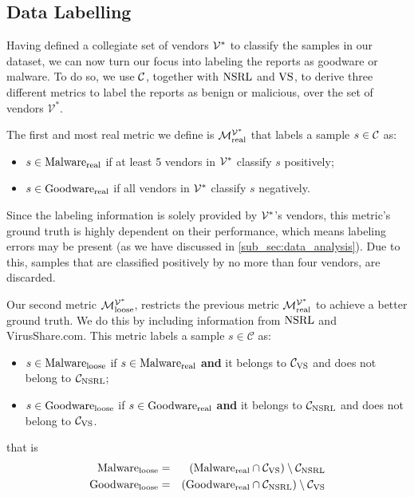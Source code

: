 \subsection{Data Labelling}\label{sub_sec:data_labeling}
Having defined a collegiate set of vendors $\mathcal{V}^*$ to classify the samples in our dataset, we can now turn our focus into labeling the reports as goodware or malware. 
To do so, we use $\mathcal{C}$, together with $\mathrm{NSRL}$ and $\mathrm{VS}$, to derive three different metrics to label the reports as benign or malicious, over the set of vendors $\mathcal{V}^*$.

The first and most real metric we define is $\mathcal{M}_{\mathrm{real}}^{\mathcal{V}^*}$ that labels a sample $s\in\mathcal{C}$ as:

\begin{itemize}
	\item $s\in\mathrm{Malware}_{\mathrm{real}}$ if at least 5 vendors in $\mathcal{V}^*$ classify $s$ positively;
	\item $s\in\mathrm{Goodware}_{\mathrm{real}}$ if all vendors in $\mathcal{V}^*$ classify $s$ negatively.
\end{itemize}

Since the labeling information is solely provided by $\mathcal{V}^*$'s vendors, this metric's ground truth is highly dependent on their performance, which means labeling errors may be present (as we have discussed in \ref{sub_sec:data_analysis}). 
Due to this, samples that are classified positively by no more than four vendors, are discarded.

\medskip

Our second metric $\mathcal{M}_{\mathrm{loose}}^{\mathcal{V}^*}$, restricts the previous metric $\mathcal{M}_{\mathrm{real}}^{\mathcal{V}^*}$ to achieve a better ground truth. We do this by including information from $\mathrm{NSRL}$ and VirusShare.com. 
This metric labels a sample $s\in\mathcal{C}$ as:

\begin{itemize}
	\item $s\in\mathrm{Malware}_{\mathrm{loose}}$ if $s\in\mathrm{Malware}_{\mathrm{real}}$ \textbf{and} it belongs to $\mathcal{C}_{\mathrm{VS}}$ and does not belong to $\mathcal{C}_{\mathrm{NSRL}}$;
	\item $s\in\mathrm{Goodware}_{\mathrm{loose}}$ if $s\in\mathrm{Goodware}_{\mathrm{real}}$ \textbf{and} it belongs to $\mathcal{C}_{\mathrm{NSRL}}$ and does not belong to $\mathcal{C}_{\mathrm{VS}}$.
\end{itemize}
that is
\begin{eqnarray*}
\mathrm{Malware}_{\mathrm{loose}}&=&\left(\mathrm{Malware}_{\mathrm{real}}\cap\mathcal{C}_{\mathrm{VS}}\right)\setminus\mathcal{C}_{\mathrm{NSRL}}\\
\mathrm{Goodware}_{\mathrm{loose}}&=&\left(\mathrm{Goodware}_{\mathrm{real}}\cap\mathcal{C}_{\mathrm{NSRL}}\right)\setminus\mathcal{C}_{\mathrm{VS}}
\end{eqnarray*}


